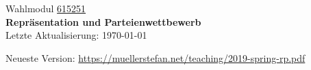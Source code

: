 \documentclass[abstract=on,parskip=full,headings=standardclasses,fontsize=11pt,paper=a4]{scrartcl}
\begin{document}
	
\singlespacing


\noindent
{}%
\hfill%

\singlespacing
\vspace{1cm}

\begin{center}
{\large Wahlmodul \href{https://studentservices.uzh.ch/uzh/anonym/vvz/index.html#/details/2018/004/E/50926420}{615251}} \\ 
\medskip
{\Large \textbf{Repräsentation und Parteienwettbewerb}} \\
\bigskip
{\large  Letzte Aktualisierung: \today}

Neueste Version: \url{https://muellerstefan.net/teaching/2019-spring-rp.pdf}
\end{center}

\vspace{1.5cm}
\end{document}
